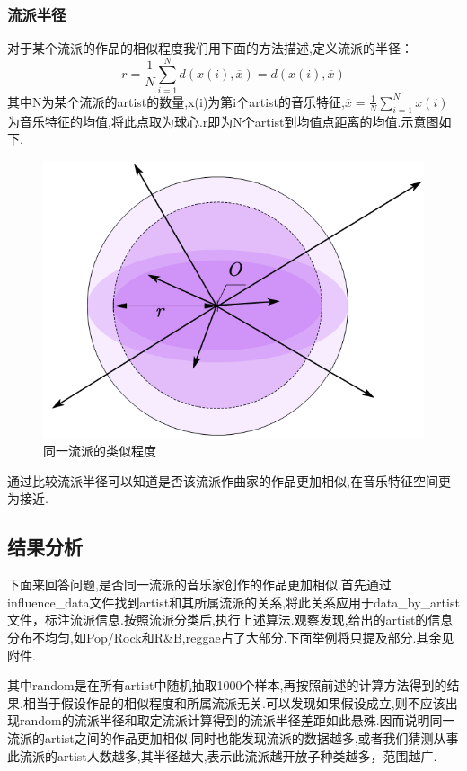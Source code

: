 \documentclass[a4paper,12pt]{article}
\begin{document}
\begin{spacing}{1.2}
	\subsubsection{流派半径}
	对于某个流派的作品的相似程度我们用下面的方法描述,定义流派的半径：
	$$
	r=\frac{1}{N}\sum\limits_{i=1}^{N}d(x(i),\overline{x})=\overline{d(x(i),\overline{x})}
	$$
	其中N为某个流派的artist的数量,x(i)为第i个artist的音乐特征,$\overline{x}=\frac{1}{N}\sum
	\limits_{i=1}^{N} x(i)$为音乐特征的均值,将此点取为球心.r即为N个artist到均值点距离的均值.示意图如下.
	\begin{figure}[!h]
		\begin{center}
			\includegraphics[scale=0.45]{dis1.png}
			\caption{同一流派的类似程度}
		\end{center}
	\end{figure}
通过比较流派半径可以知道是否该流派作曲家的作品更加相似,在音乐特征空间更为接近.
\subsection{结果分析}
下面来回答问题,是否同一流派的音乐家创作的作品更加相似.首先通过influence\_data文件找到artist和其所属流派的关系,将此关系应用于data\_by\_artist文件，标注流派信息.按照流派分类后,执行上述算法.观察发现,给出的artist的信息分布不均匀,如Pop/Rock和R\&B,reggae占了大部分.下面举例将只提及部分.其余见附件.
\begin{table}[H]
	\centering
\end{table}
其中random是在所有artist中随机抽取1000个样本,再按照前述的计算方法得到的结果.相当于假设作品的相似程度和所属流派无关.可以发现如果假设成立,则不应该出现random的流派半径和取定流派计算得到的流派半径差距如此悬殊.因而说明同一流派的artist之间的作品更加相似.同时也能发现流派的数据越多,或者我们猜测从事此流派的artist人数越多,其半径越大,表示此流派越开放子种类越多，范围越广.

\end{spacing}
\end{document}
